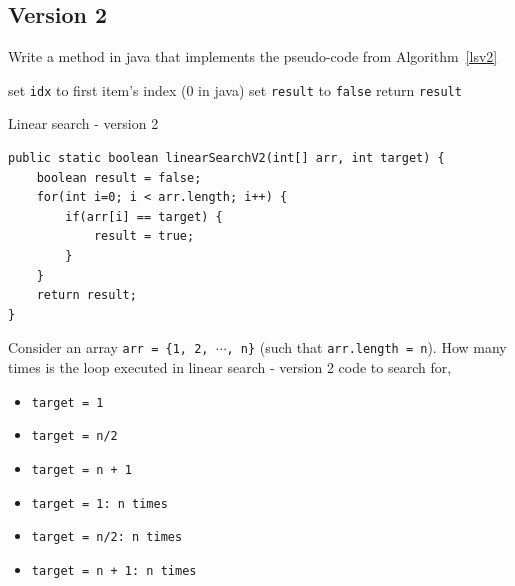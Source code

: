 \subsection{Version 2}

\vskip 1cm

\begin{exercise}
Write a method in java that implements the pseudo-code from Algorithm~\ref{lsv2}

\IncMargin{1em}
\begin{algorithm}[H]
	\SetAlgoLined
{}
set \texttt{idx} to first item's index (0 in java)\;
set \texttt{result} to \texttt{false}\;
return \texttt{result}\;
\caption{Linear search - version 2 \label{lsv2}}
\end{algorithm}
\end{exercise}
\begin{answer}
\begin{lstlisting}
public static boolean linearSearchV2(int[] arr, int target) {
	boolean result = false;
	for(int i=0; i < arr.length; i++) {
		if(arr[i] == target) {
			result = true;
		}
	}
	return result;
}
\end{lstlisting}	
\end{answer}
 
\begin{exercise}
Consider an array \texttt{arr = \{1, 2, $\cdots$, n\}} (such that \texttt{arr.length = n}). How many times is the loop executed in linear search - version 2 code to search for,

\begin{itemize}
\item \texttt{target = 1}	
\item \texttt{target = n/2}	
\item \texttt{target = n + 1}	
\end{itemize}	
\end{exercise}
\begin{answer}
\begin{itemize}
\item \texttt{target = 1: n times}
\item \texttt{target = n/2: n times}
\item \texttt{target = n + 1: n times}
\end{itemize}
\end{answer}

